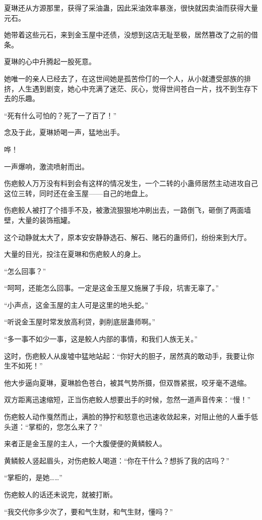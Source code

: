 \begin{this_body}
夏琳还从方源那里，获得了采油蛊，因此采油效率暴涨，很快就因卖油而获得大量元石。

她带着这些元石，来到金玉屋中还债，没想到这店无耻至极，居然篡改了之前的借条。

夏琳的心中升腾起一股死意。

她唯一的亲人已经去了，在这世间她是孤苦伶仃的一个人，从小就遭受部族的排挤，人生遇到剧变，她心中充满了迷茫、灰心，觉得世间苍白一片，找不到生存下去的乐趣。

“死有什么可怕的？死了一了百了！”

念及于此，夏琳娇喝一声，猛地出手。

哗！

一声爆响，激流喷射而出。

伤疤鲛人万万没有料到会有这样的情况发生，一个二转的小蛊师居然主动进攻自己这位三转，同时还在金玉屋——自己的地盘上。

伤疤鲛人被打了个措手不及，被激流狠狠地冲刷出去，一路倒飞，砸倒了两面墙壁，大量的装饰瓶罐。

这个动静就太大了，原本安安静静选石、解石、赌石的蛊师们，纷纷来到大厅。

大量的目光，投注在夏琳和伤疤鲛人的身上。

“怎么回事？”

“呵呵，还能怎么回事。一定是这金玉屋又施展了手段，坑害无辜了。”

“小声点，这金玉屋的主人可是这里的地头蛇。”

“听说金玉屋时常发放高利贷，剥削底层蛊师啊。”

“多一事不如少一事，这是鲛人内部的事情，和我们人族无关。”

这时，伤疤鲛人从废墟中猛地站起：“你好大的胆子，居然真的敢动手，我要让你生不如死！”

他大步逼向夏琳，夏琳脸色苍白，被其气势所摄，但双唇紧抿，咬牙毫不退缩。

双方距离迅速缩短，正当伤疤鲛人想要出手的时候，忽然一道声音传来：“慢！”

伤疤鲛人动作戛然而止，满脸的狰狞和怒意也迅速收敛起来，对阻止他的人垂手低头道：“掌柜的，您怎么来了？”

来者正是金玉屋的主人，一个大腹便便的黄鳞鲛人。

黄鳞鲛人竖起眉头，对伤疤鲛人喝道：“你在干什么？想拆了我的店吗？”

“掌柜的，是她……”

伤疤鲛人的话还未说完，就被打断。

“我交代你多少次了，要和气生财，和气生财，懂吗？”


\end{this_body}
